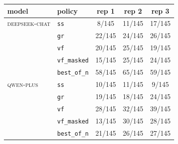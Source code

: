 \begin{tabular}{llccc}
\toprule
model & policy & rep 1 & rep 2 & rep 3 \\
\midrule
\textsc{deepseek-chat} & \texttt{ss} & 8/145 & 11/145 & 17/145 \\
 & \texttt{gr} & 22/145 & 24/145 & 26/145 \\
 & \texttt{vf} & 20/145 & 25/145 & 19/145 \\
 & \texttt{vf\_masked} & 15/145 & 25/145 & 24/145 \\
 & \texttt{best\_of\_n} & 58/145 & 65/145 & 59/145 \\
\midrule
\textsc{qwen-plus} & \texttt{ss} & 10/145 & 11/145 & 9/145 \\
 & \texttt{gr} & 19/145 & 18/145 & 24/145 \\
 & \texttt{vf} & 28/145 & 32/145 & 39/145 \\
 & \texttt{vf\_masked} & 13/145 & 30/145 & 28/145 \\
 & \texttt{best\_of\_n} & 21/145 & 26/145 & 27/145 \\
\bottomrule
\end{tabular}
